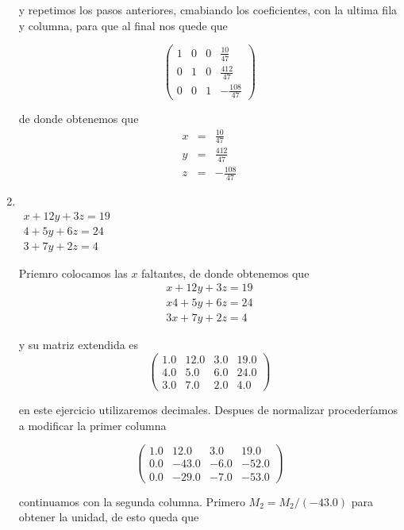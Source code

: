 \documentclass[11pt]{article}
\begin{document}
\begin{multicols}{2}
\begin{enumerate}[\bf{Sistema} 1]
			y repetimos los pasos anteriores, cmabiando los coeficientes, con la ultima fila y columna, para que al final nos quede que
			
			$$\left(\begin{array}{rrrr}
				1 & 0 & 0 & \frac{10}{47} \\
				0 & 1 & 0 & \frac{412}{47} \\
				0 & 0 & 1 & -\frac{108}{47}
			\end{array}\right)$$
			
			de donde obtenemos que		
			\begin{eqnarray*}
				x &=& \frac{10}{47} \\
				y &=& \frac{412}{47} \\
				z &=&-\frac{108}{47}
			\end{eqnarray*}			


		\item
			\ \\ $\begin{matrix}
				x + 12y + 3z = 19 \\
				4 +  5y + 6z = 24 \\
				3 +  7y + 2z = 4
			\end{matrix}$

			\par Priemro colocamos las $x$ faltantes, de donde obtenemos que 
			$$\begin{matrix}
				 x + 12y + 3z = 19 \\
				x4 +  5y + 6z = 24 \\
				3x +  7y + 2z = 4
			\end{matrix}$$
			
			y su matriz extendida es			
			$$\left(\begin{array}{rrrr}
				1.0 & 12.0 & 3.0 & 19.0 \\
				4.0 & 5.0 & 6.0 & 24.0 \\
				3.0 & 7.0 & 2.0 & 4.0
			\end{array}\right)$$
			
			en este ejercicio utilizaremos decimales. Despues de normalizar proceder\'iamos a modificar la primer columna
			
			$$\left(\begin{array}{rrrr}
				1.0 & 12.0 & 3.0 & 19.0 \\
				0.0 & -43.0 & -6.0 & -52.0 \\
				0.0 & -29.0 & -7.0 & -53.0
			\end{array}\right)$$
			
			continuamos con la segunda columna. Primero $M_2 = M_2/(-43.0)$ para obtener la unidad, de esto queda que 
			

\end{enumerate}
\end{multicols}
\end{document}
